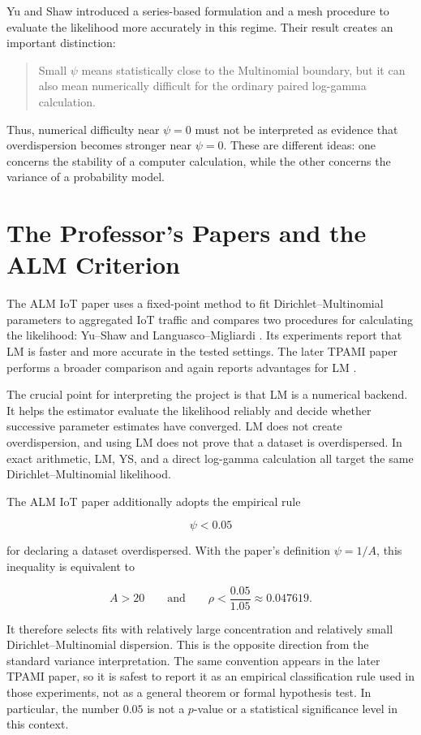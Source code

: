 \documentclass[11pt,a4paper]{article}
\begin{document}
Yu and Shaw introduced a series-based formulation and a mesh procedure to
evaluate the likelihood more accurately in this regime.  Their result creates
an important distinction:

\begin{quote}
Small $\psi$ means statistically close to the Multinomial boundary, but it can
also mean numerically difficult for the ordinary paired log-gamma calculation.
\end{quote}

Thus, numerical difficulty near $\psi=0$ must not be interpreted as evidence
that overdispersion becomes stronger near $\psi=0$.  These are different
ideas: one concerns the stability of a computer calculation, while the other
concerns the variance of a probability model.

\section{The Professor's Papers and the ALM Criterion}

The ALM IoT paper uses a fixed-point method to fit Dirichlet--Multinomial
parameters to aggregated IoT traffic and compares two procedures for
calculating the likelihood: Yu--Shaw and Languasco--Migliardi
\cite{alm-iot}.  Its experiments report that LM is faster and more accurate in
the tested settings.  The later TPAMI paper performs a broader comparison and
again reports advantages for LM \cite{baddar-et-al-2025}.

The crucial point for interpreting the project is that LM is a numerical
backend.  It helps the estimator evaluate the likelihood reliably and decide
whether successive parameter estimates have converged.  LM does not create
overdispersion, and using LM does not prove that a dataset is overdispersed.
In exact arithmetic, LM, YS, and a direct log-gamma calculation all target the
same Dirichlet--Multinomial likelihood.

The ALM IoT paper additionally adopts the empirical rule

\[
\psi<0.05
\]

for declaring a dataset overdispersed.  With the paper's definition
$\psi=1/A$, this inequality is equivalent to

\[
A>20
\qquad\text{and}\qquad
\rho<\frac{0.05}{1.05}\approx0.047619.
\]

It therefore selects fits with relatively large concentration and relatively
small Dirichlet--Multinomial dispersion.  This is the opposite direction from
the standard variance interpretation.  The same convention appears in the
later TPAMI paper, so it is safest to report it as an empirical classification
rule used in those experiments, not as a general theorem or formal
hypothesis test.  In particular, the number $0.05$ is not a $p$-value or a
statistical significance level in this context.
\end{document}
